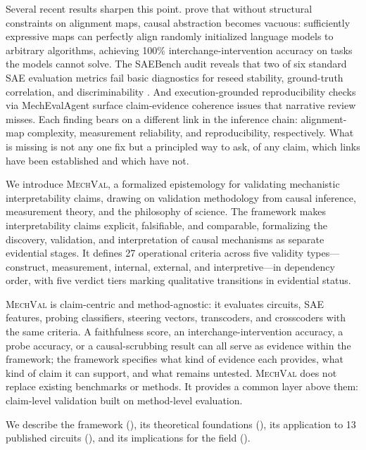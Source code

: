 \documentclass[10pt]{article}
\newcommand{\mechval}{\textsc{MechVal}}
\begin{document}
Several recent results sharpen this point. \citet{sutter2025nonlinear} prove that without
structural constraints on alignment maps, causal abstraction becomes vacuous: sufficiently
expressive maps can perfectly align randomly initialized language models to arbitrary
algorithms, achieving 100\% interchange-intervention accuracy on tasks the models cannot
solve. The SAEBench audit reveals that two of six standard SAE evaluation metrics fail
basic diagnostics for reseed stability, ground-truth correlation, and discriminability
\citep{karvonen2025saebench}. And execution-grounded reproducibility checks via
MechEvalAgent \citep{bai2026mecheval} surface claim-evidence coherence issues that
narrative review misses. Each finding bears on a different link in the inference chain:
alignment-map complexity, measurement reliability, and reproducibility, respectively. What
is missing is not any one fix but a principled way to ask, of any claim, which links have
been established and which have not.

We introduce \mechval{}, a formalized epistemology for validating mechanistic
interpretability claims, drawing on validation methodology from causal inference,
measurement theory, and the philosophy of science. The framework makes interpretability
claims explicit, falsifiable, and comparable, formalizing the discovery, validation, and
interpretation of causal mechanisms as separate evidential stages. It defines 27
operational criteria across five validity types---construct, measurement, internal,
external, and interpretive---in dependency order, with five verdict tiers marking
qualitative transitions in evidential status.

\mechval{} is claim-centric and method-agnostic: it evaluates circuits, SAE features,
probing classifiers, steering vectors, transcoders, and crosscoders with the same
criteria. A faithfulness score, an interchange-intervention accuracy, a probe accuracy, or
a causal-scrubbing result can all serve as evidence within the framework; the framework
specifies what kind of evidence each provides, what kind of claim it can support, and what
remains untested. \mechval{} does not replace existing benchmarks or methods. It provides a
common layer above them: claim-level validation built on method-level evaluation.

We describe the framework (), its theoretical foundations
(), its application to 13 published circuits
(), and its implications for the field ().
\end{document}

